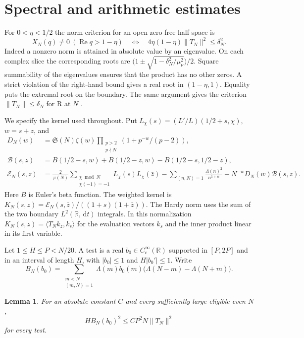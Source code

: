 \documentclass[11pt,a4paper]{article}
\newtheorem{lemma}[theorem]{Lemma}
\newcommand{\SSg}{\mathfrak S}
\newcommand{\dd}{\,\mathrm d}
\DeclareMathOperator{\Rea}{Re}
\begin{document}
\section{Spectral and arithmetic estimates}\label{sec:entry}
For $0<\eta<1/2$ the norm criterion for an open zero-free half-space is
\begin{equation}\label{eq:dict}
 X_N(q)\ne0\ (\Rea q>1-\eta)
 \quad\Longleftrightarrow\quad
 4\eta(1-\eta)\|T_N\|^2\le\delta_N^2 .
\end{equation}
Indeed a nonzero norm is attained in absolute value by an eigenvalue. On each complex slice the corresponding roots are
$\bigl(1\pm\sqrt{1-\delta_N^2/\mu_\nu^2}\bigr)/2$.
Square summability of the eigenvalues ensures that the product has no other zeros. A strict violation of the right-hand bound gives a real root in $(1-\eta,1)$. Equality puts the extremal root on the boundary. The same argument gives the criterion $\|T_N\|\le\delta_N$ for R at $N$ \cite[Theorem 6.1]{LL}.

We specify the kernel used throughout. Put $L_\chi(s)=(L'/L)(1/2+s,\chi)$, $w=s+z$, and
\begin{align*}
 D_N(w)&=\SSg(N)\zeta(w)\prod_{\substack{p>2\\p\nmid N}}
                    (1+p^{-w}/(p-2)),\\
 \mathcal B(s,z)&=B(1/2-s,w)+B(1/2-z,w)-B(1/2-s,1/2-z),\\
 \mathcal E_N(s,z)&=\frac{2}{\varphi(N)}
       \sum_{\substack{\chi\bmod N\\\chi(-1)=-1}} L_\chi(s)\overline{L_\chi(\bar z)}
       -\sum_{(n,N)=1}\frac{\Lambda(n)^2}{n^{1+w}}-N^{-w}D_N(w)\mathcal B(s,z).
\end{align*}
Here $B$ is Euler's beta function. The weighted kernel is
$K_N(s,z)=\mathcal E_N(s,\bar z)/((1+s)(1+\bar z))$. The Hardy norm uses the sum of the two boundary $L^2(\mathbb R,\dd t)$ integrals. In this normalization $K_N(s,z)=\langle T_Nk_z,k_s\rangle$ for the evaluation vectors $k_s$ and the inner product linear in its first variable.

Let $1\le H\le P<N/20$. A test is a real $b_0\in C^\infty_c(\mathbb R)$ supported in $[P,2P]$ and in an interval of length $H$, with $|b_0|\le1$ and $H|b_0'|\le1$. Write
\[
 B_N(b_0)=\sum_{\substack{m<N\\(m,N)=1}}\Lambda(m)b_0(m)
                 \bigl(\Lambda(N-m)-\Lambda(N+m)\bigr).
\]
\begin{lemma}\label{lm:transfer}
For an absolute constant $C$ and every sufficiently large eligible even $N$,
\begin{equation}\label{eq:transfer}
 H B_N(b_0)^2\le C P^2 N\|T_N\|^2
\end{equation}
for every test.
\end{lemma}
\end{document}
